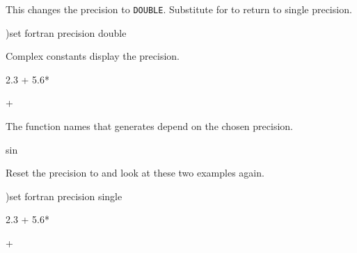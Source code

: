 \begin{noOutputXtc}
\begin{xtccomment}
This changes the precision to {\tt DOUBLE}.
Substitute  for 
to return to single precision.
\end{xtccomment}
\begin{spadsrc}
)set fortran precision double 
\end{spadsrc}
\end{noOutputXtc}
\begin{xtc}
\begin{xtccomment}
Complex constants display the precision.
\end{xtccomment}
\begin{spadsrc}
2.3 + 5.6*%
\end{spadsrc}
\begin{TeXOutput}
\begin{fricasmath}{5}
+\TIMES \ImaginaryI %
\end{fricasmath}
\end{TeXOutput}
\end{xtc}
\begin{xtc}
\begin{xtccomment}
The function names that \Language{} generates depend on the chosen
precision.
\end{xtccomment}
\begin{spadsrc}
sin %
\end{spadsrc}
\begin{TeXOutput}
\begin{fricasmath}{6}
\sin{\EulerE }%
\end{fricasmath}
\end{TeXOutput}
\end{xtc}
\begin{noOutputXtc}
\begin{xtccomment}
Reset the precision to  and look at these two
examples again.
\end{xtccomment}
\begin{spadsrc}
)set fortran precision single 
\end{spadsrc}
\end{noOutputXtc}
\begin{xtc}
\begin{xtccomment}
\end{xtccomment}
\begin{spadsrc}
2.3 + 5.6*%
\end{spadsrc}
\begin{TeXOutput}
\begin{fricasmath}{7}
+\TIMES \ImaginaryI %
\end{fricasmath}
\end{TeXOutput}
\end{xtc}
